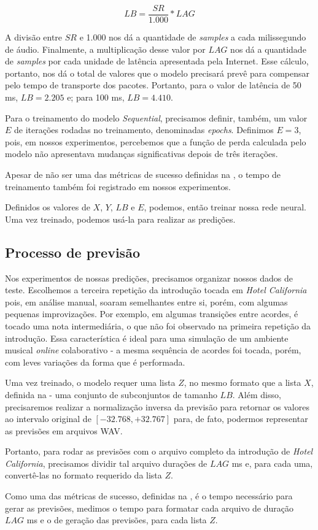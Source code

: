 \begin{equation}
    LB = \frac{SR}{1.000} * LAG
\end{equation}

A divisão entre $SR$ e 1.000 nos dá a quantidade de \textit{samples} a cada milissegundo de áudio. Finalmente, a multiplicação desse valor por $LAG$ nos dá a quantidade de \textit{samples} por cada unidade de latência apresentada pela Internet. Esse cálculo, portanto, nos dá o total de valores que o modelo precisará prevê para compensar pelo tempo de transporte dos pacotes. Portanto, para o valor de latência de 50 ms, $LB = 2.205$ e; para 100 ms, $LB = 4.410$.

Para o treinamento do modelo \textit{Sequential}, precisamos definir, também, um valor $E$ de iterações rodadas no treinamento, denominadas \textit{epochs}. Definimos $E = 3$, pois, em nossos experimentos, percebemos que a função de perda calculada pelo modelo não apresentava mudanças significativas depois de três iterações.

Apesar de não ser uma das métricas de sucesso definidas na , o tempo de treinamento também foi registrado em nossos experimentos.

Definidos os valores de $X$, $Y$, $LB$ e $E$, podemos, então treinar nossa rede neural. Uma vez treinado, podemos usá-la para realizar as predições.

\subsection{Processo de previsão}

Nos experimentos de nossas predições, precisamos organizar nossos dados de teste. Escolhemos a terceira repetição da introdução tocada em \textit{Hotel California} pois, em análise manual, soaram semelhantes entre si, porém, com algumas pequenas improvizações. Por exemplo, em algumas transições entre acordes, é tocado uma nota intermediária, o que não foi observado na primeira repetição da introdução. Essa característica é ideal para uma simulação de um ambiente musical \textit{online} colaborativo - a mesma sequência de acordes foi tocada, porém, com leves variações da forma que é performada.

Uma vez treinado, o modelo requer uma lista $Z$, no mesmo formato que a lista $X$, definida na  - uma conjunto de subconjuntos de tamanho $LB$. Além disso, precisaremos realizar a normalização inversa da previsão para retornar os valores ao intervalo original de $[-32.768, +32.767]$ para, de fato, podermos representar as previsões em arquivos WAV.

Portanto, para rodar as previsões com o arquivo completo da introdução de \textit{Hotel California}, precisamos dividir tal arquivo durações de $LAG$ ms e, para cada uma, convertê-las no formato requerido da lista $Z$.

Como uma das métricas de sucesso, definidas na , é o tempo necessário para gerar as previsões, medimos o tempo para formatar cada arquivo de duração $LAG$ ms e o de geração das previsões, para cada lista $Z$.